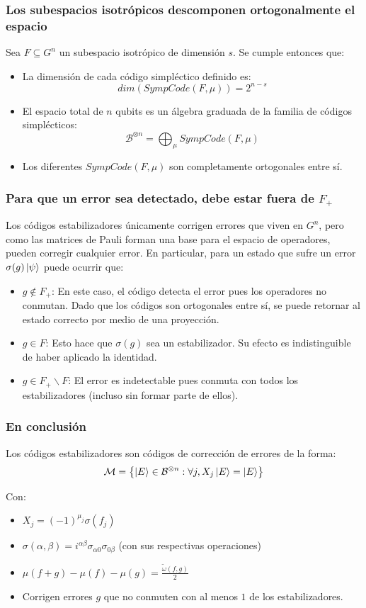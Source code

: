\documentclass[english,9pt]{Linnaeus}
\begin{document}
\begin{frame}
  \frametitle{Los subespacios isotrópicos descomponen ortogonalmente el espacio}
  Sea $F \subseteq G^n$ un subespacio isotrópico de dimensión $s$. Se cumple entonces que:
  \begin{itemize}
    \item La dimensión de cada código simpléctico definido es:
      $$dim(SympCode(F, \mu)) = 2^{n - s}$$
    \item El espacio total de $n$ qubits es un álgebra graduada de la familia de códigos simplécticos:
      $$\mathcal{B}^{\otimes n} = \bigoplus_{\mu} SympCode(F, \mu)$$
    \item Los diferentes $SympCode(F, \mu)$ son completamente ortogonales entre sí.
  \end{itemize}
\end{frame}

\begin{frame}
  \frametitle{Para que un error sea detectado, debe estar fuera de $F_+$}

  Los códigos estabilizadores únicamente corrigen errores que viven en $G^n$, pero como las matrices de Pauli forman una base para el espacio de operadores, pueden corregir cualquier error. En particular, para un estado que sufre un error $\sigma(g) \ket{\psi}$ puede ocurrir que:
  \begin{itemize}
    \item $g \not\in F_+$: En este caso, el código detecta el error pues los operadores no conmutan. Dado que los códigos son ortogonales entre sí, se puede retornar al estado correcto por medio de una proyección.
    \item $g \in F$: Esto hace que $\sigma(g)$ sea un estabilizador. Su efecto es indistinguible de haber aplicado la identidad.
    \item $g \in F_+ \backslash F$: El error es indetectable pues conmuta con todos los estabilizadores (incluso sin formar parte de ellos).
  \end{itemize}
\end{frame}

\begin{frame}
  \frametitle{En conclusión}
  Los códigos estabilizadores son códigos de corrección de errores de la forma:
  \[
    \mathcal{M} = \left\{ \ket{E} \in \mathcal{B}^{\otimes n} : \forall j, X_j \ket{E} = \ket{E}\right\}
  \]

  Con:
  \begin{itemize}
    \item $X_j = (-1)^{\mu_j} \sigma(f_j)$
    \item $\sigma(\alpha, \beta) = i^{\alpha\beta} \sigma_{\alpha 0}\sigma_{0 \beta}$ (con sus respectivas operaciones)
    \item $\mu(f + g) - \mu(f) - \mu(g) = \frac{\tilde{\omega}(f, g)}{2}$
    \item Corrigen errores $g$ que no conmuten con al menos $1$ de los estabilizadores.
  \end{itemize}

\end{frame}
\end{document}
